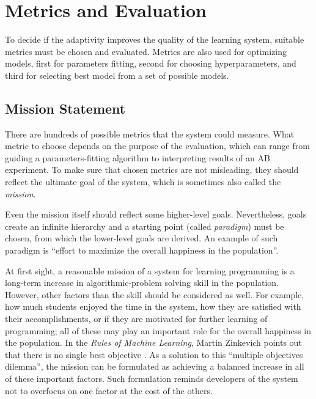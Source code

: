 \section{Metrics and Evaluation}
\label{sec:metrics-and-evaluation}


To decide if the adaptivity improves the quality of the learning system,
  suitable metrics must be chosen and evaluated.
Metrics are also used for optimizing models,
  first for parameters fitting, second for choosing hyperparameters,
  and third for selecting best model from a set of possible models.


\subsection{Mission Statement}
\label{sec:mission}

There are hundreds of possible metrics that the system could measure.
What metric to choose depends on the purpose of the evaluation,
  which can range from guiding a parameters-fitting algorithm
  to interpreting results of an AB experiment.
To make sure that chosen metrics are not misleading,
  they should reflect the ultimate goal of the system,
  which is sometimes also called the \emph{mission}.

Even the mission itself should reflect some higher-level goals.
Nevertheless, goals create an infinite hierarchy
  and a starting point (called \emph{paradigm}) must be chosen,
  from which the lower-level goals are derived.
An example of such paradigm is
  ``effort to maximize the overall happiness in the population''.

At first sight, a reasonable mission of a system for learning programming
  is a long-term increase in algorithmic-problem solving skill in the population.
However, other factors than the skill should be considered as well.
For example, how much students enjoyed the time in the system,
  how they are satisfied with their accomplishments,
  or if they are motivated for further learning of programming;
  all of these may play an important role for the overall happiness in the population.
In the \emph{Rules of Machine Learning}, Martin Zinkevich
  points out that there is no single best objective \cite[][Rule \#39]{google-ml-rules}.
As a solution to this ``multiple objectives dilemma'',
  the mission can be formulated as achieving a balanced increase in all
  of these important factors.
Such formulation reminds developers of the system not to overfocus on one factor
  at the cost of the others.


